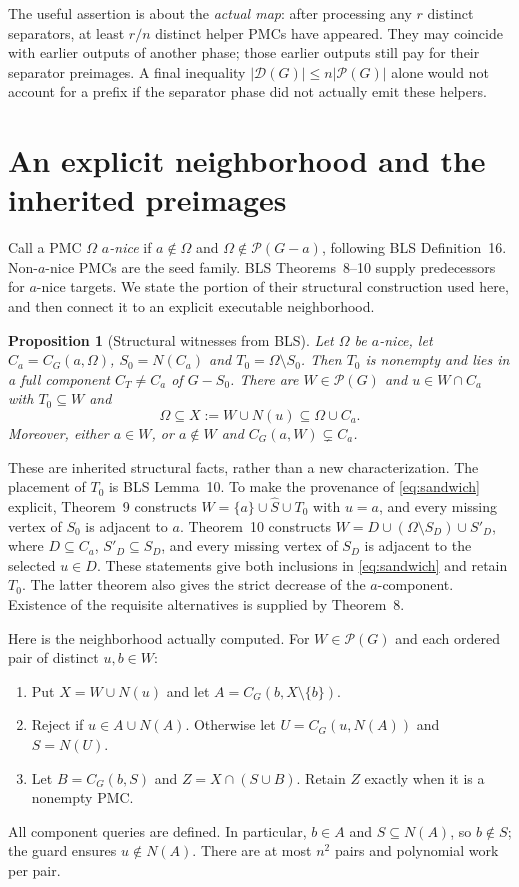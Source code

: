\documentclass[acmsmall,12pt,screen,nonacm]{acmart}
\newtheorem{proposition}[theorem]{Proposition}
\newcommand{\PMC}{\mathcal P}
\newcommand{\Sep}{\mathcal D}
\begin{document}
The useful assertion is about the \emph{actual map}: after processing any
$r$ distinct separators, at least $r/n$ distinct helper PMCs have appeared.
They may coincide with earlier outputs of another phase; those earlier outputs
still pay for their separator preimages. A final inequality
$|\Sep(G)|\le n|\PMC(G)|$ alone would not account for a prefix if the
separator phase did not actually emit these helpers.

\section{An explicit neighborhood and the inherited preimages}\label{sec:arcs}

Call a PMC $\Omega$ \emph{$a$-nice} if $a\notin\Omega$ and
$\Omega\notin\PMC(G-a)$, following BLS Definition~16. Non-$a$-nice PMCs
are the seed family. BLS Theorems~8--10 supply predecessors for $a$-nice
targets. We state the portion of their structural construction used here,
and then connect it to an explicit executable neighborhood.

\begin{proposition}[Structural witnesses from BLS]\label{prop:witness}
Let $\Omega$ be $a$-nice, let $C_a=C_G(a,\Omega)$, $S_0=N(C_a)$ and
$T_0=\Omega\setminus S_0$. Then $T_0$ is nonempty and lies in a full
component $C_T\ne C_a$ of $G-S_0$. There are $W\in\PMC(G)$ and
$u\in W\cap C_a$ with $T_0\subseteq W$ and
\begin{equation}\label{eq:sandwich}
 \Omega\subseteq X:=W\cup N(u)\subseteq\Omega\cup C_a.
\end{equation}
Moreover, either $a\in W$, or $a\notin W$ and
$C_G(a,W)\subsetneq C_a$.
\end{proposition}

These are inherited structural facts, rather than a new characterization.
The placement of $T_0$ is BLS Lemma~10. To make the provenance of
\eqref{eq:sandwich} explicit, Theorem~9 constructs
$W=\{a\}\cup\widehat S\cup T_0$ with $u=a$, and every missing vertex
of $S_0$ is adjacent to $a$. Theorem~10 constructs
$W=D\cup(\Omega\setminus S_D)\cup S'_D$, where $D\subseteq C_a$,
$S'_D\subseteq S_D$, and every missing vertex of $S_D$ is adjacent to the
selected $u\in D$. These statements give both inclusions in
\eqref{eq:sandwich} and retain $T_0$. The latter theorem also gives the
strict decrease of the $a$-component. Existence of the requisite alternatives
is supplied by Theorem~8.

Here is the neighborhood actually computed. For $W\in\PMC(G)$ and each
ordered pair of distinct $u,b\in W$:
\begin{enumerate}
\item Put $X=W\cup N(u)$ and let $A=C_G(b,X\setminus\{b\})$.
\item Reject if $u\in A\cup N(A)$. Otherwise let
$U=C_G(u,N(A))$ and $S=N(U)$.
\item Let $B=C_G(b,S)$ and $Z=X\cap(S\cup B)$. Retain $Z$ exactly when
it is a nonempty PMC.
\end{enumerate}
All component queries are defined. In particular, $b\in A$ and
$S\subseteq N(A)$, so $b\notin S$; the guard ensures $u\notin N(A)$.
There are at most $n^2$ pairs and polynomial work per pair.
\end{document}
